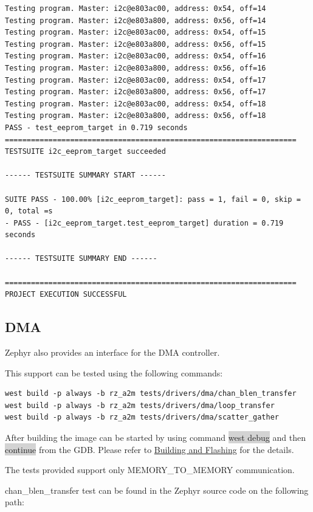 \documentclass[11pt,a4paper,oneside]{article}
\begin{document}
\begin{lstlisting}
Testing program. Master: i2c@e803ac00, address: 0x54, off=14
Testing program. Master: i2c@e803a800, address: 0x56, off=14
Testing program. Master: i2c@e803ac00, address: 0x54, off=15
Testing program. Master: i2c@e803a800, address: 0x56, off=15
Testing program. Master: i2c@e803ac00, address: 0x54, off=16
Testing program. Master: i2c@e803a800, address: 0x56, off=16
Testing program. Master: i2c@e803ac00, address: 0x54, off=17
Testing program. Master: i2c@e803a800, address: 0x56, off=17
Testing program. Master: i2c@e803ac00, address: 0x54, off=18
Testing program. Master: i2c@e803a800, address: 0x56, off=18
PASS - test_eeprom_target in 0.719 seconds
===================================================================
TESTSUITE i2c_eeprom_target succeeded

------ TESTSUITE SUMMARY START ------

SUITE PASS - 100.00% [i2c_eeprom_target]: pass = 1, fail = 0, skip = 0, total =s
- PASS - [i2c_eeprom_target.test_eeprom_target] duration = 0.719 seconds

------ TESTSUITE SUMMARY END ------

===================================================================
PROJECT EXECUTION SUCCESSFUL
\end{lstlisting}

\subsection{DMA}\label{dma}

Zephyr also provides an interface for the DMA controller.

This support can be tested using the following commands:

\begin{lstlisting}
west build -p always -b rz_a2m tests/drivers/dma/chan_blen_transfer
west build -p always -b rz_a2m tests/drivers/dma/loop_transfer
west build -p always -b rz_a2m tests/drivers/dma/scatter_gather
\end{lstlisting}

After building the image can be started by using command \colorbox{lightgray}{west debug}
and then \colorbox{lightgray}{continue} from the GDB. Please refer to
\hyperref[building-and-flashing]{Building and Flashing} for the
details.

The tests provided support only MEMORY\_TO\_MEMORY communication.

chan\_blen\_transfer test can be found in the Zephyr source code on the
following path:
\end{document}

